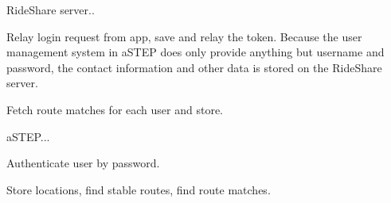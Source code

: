 RideShare server..

Relay login request from app, save and relay the token.
Because the user management system in aSTEP does only provide anything but username and password, the contact information and other data is stored on the RideShare server.


Fetch route matches for each user and store.



aSTEP...

Authenticate user by password.

Store locations, find stable routes, find route matches.
